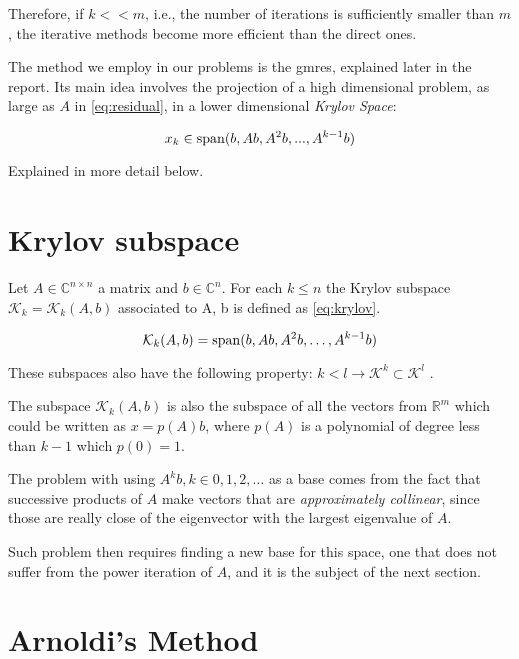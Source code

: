 Therefore, if $k<<m$, i.e., the number of iterations is sufficiently smaller than $m$, the iterative methods become more efficient than the direct ones.



The method we employ in our problems is the \acrfull{gmres}, explained later in the report. Its main idea involves the projection of a high dimensional problem, as large as $A$ in \ref{eq:residual}, in a lower dimensional \textit{Krylov Space}:

\begin{equation}\label{eq:xkry}
    x_{k} \in \operatorname{span}(b,Ab,A^{2}b,...,A^{k-1}b)
\end{equation}

Explained in more detail below.

\section{Krylov subspace}
Let $A \in \mathbb{C}^{n \times n}$ a matrix and $b\in \mathbb{C}^{n}$. For each $k\leq n$ the Krylov subspace $\mathcal{K}_{k}=\mathcal{K}_{k}(A,b)$ associated to A, b is defined as \ref{eq:krylov}.

\begin{equation}\label{eq:krylov}
    \mathcal{K}_{k}(A,b) = \operatorname{span}(b,Ab,A^{2}b,\dots , A^{k-1}b)
\end{equation}

These subspaces also have the following property: $k<l \to \mathcal{K}^{k} \subset \mathcal{K}^{l}$ \cite{bonnet}.

The subspace $\mathcal{K}_{k}(A,b)$ is also the subspace of all the vectors from $\mathbb{R}^{m}$ which could be written as $x=p(A)b$, where $p(A)$ is a polynomial of degree less than $k-1$ which $p(0)=1$.

The problem with using ${A^{k}b}, k \in {0,1,2,\dots}$ as a base comes from the fact that successive products of $A$ make vectors that are \textit{approximately collinear}, since those are really close of the eigenvector with the largest eigenvalue of $A$.

Such problem then requires finding a new base for this space, one that does not suffer from the power iteration of $A$, and it is the subject of the next section.

\section{Arnoldi's Method}


